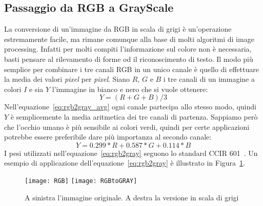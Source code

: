 
\subsection {Passaggio da RGB a GrayScale}
La conversione di un'immagine da RGB in scala di grigi è un'operazione estremamente facile, ma rimane comunque alla base di molti algoritmi di image processing.
Infatti per molti compiti l'informazione sul colore non è necessaria, basti pensare al rilevamento di forme od il riconoscimento di testo.
Il modo più semplice per combinare i tre canali RGB in un unico canale è quello di effettuare la media dei valori \textit{pixel} per \textit{pixel}.
Siano $R$, $G$ e $B$ i tre canali di un immagine a colori $I$ e sia $Y$ l'immagine in bianco e nero che si vuole ottenere:
\begin{equation}
  Y = (R + G + B)/3
\end{equation}
\label{eq:rgb2gray_avg}
Nell'equazione~\ref{eq:rgb2gray_avg} ogni canale partecipa allo stesso modo, quindi $Y$ è semplicemente la media aritmetica dei tre canali di partenza.
Sappiamo però che l'occhio umano è più sensibile ai colori verdi, quindi per certe applicazioni potrebbe essere preferibile dare più importanza al secondo canale:
\begin{equation}
  Y = 0.299*R + 0.587*G + 0.114*B
\end{equation}
\label{eq:rgb2gray}
I pesi utilizzati nell'equazione~\ref{eq:rgb2gray} seguono lo standard CCIR 601~\cite{ccir601}.
Un esempio di applicazione dell'equazione~\ref{eq:rgb2gray} è illustrato in Figura~\ref{fig:rgb2gray_example}.
\begin{figure}[ht]
  \begin{center}
    \texttt{[image: RGB]}
    \texttt{[image: RGBtoGRAY]}
    \caption{A sinistra l'immagine originale. A destra la versione in scala di grigi}
    \label{fig:rgb2gray_example}
  \end{center}
\end{figure}

